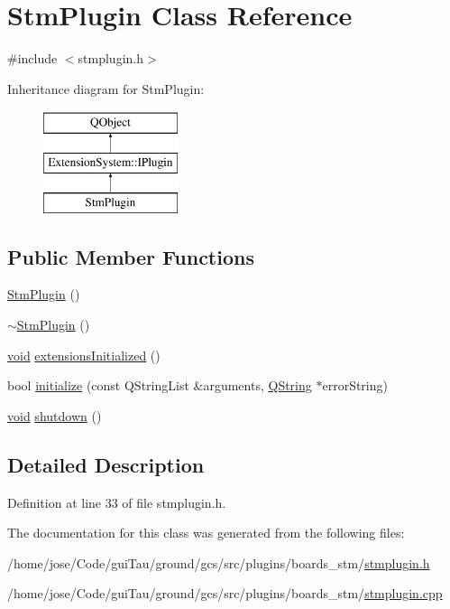 \hypertarget{class_stm_plugin}{\section{Stm\-Plugin Class Reference}
\label{class_stm_plugin}
}


{\ttfamily \#include $<$stmplugin.\-h$>$}

Inheritance diagram for Stm\-Plugin\-:\begin{figure}[H]
\begin{center}
\leavevmode
\includegraphics[height=3.000000cm]{class_stm_plugin}
\end{center}
\end{figure}
\subsection*{Public Member Functions}
\begin{DoxyCompactItemize}
\item 
\hyperlink{group___boards___stm_gab32837a38747d81c460fd1ba4bc438f8}{Stm\-Plugin} ()
\item 
\hyperlink{group___boards___stm_gaa4103ec74dcbf5261ad6ae6dc37da0ea}{$\sim$\-Stm\-Plugin} ()
\item 
\hyperlink{group___u_a_v_objects_plugin_ga444cf2ff3f0ecbe028adce838d373f5c}{void} \hyperlink{group___boards___stm_ga5269accdd6abc59b3b45cdf2f944d205}{extensions\-Initialized} ()
\item 
bool \hyperlink{group___boards___stm_ga9cf15e32e77519654896a82f0b301710}{initialize} (const Q\-String\-List \&arguments, \hyperlink{group___u_a_v_objects_plugin_gab9d252f49c333c94a72f97ce3105a32d}{Q\-String} $\ast$error\-String)
\item 
\hyperlink{group___u_a_v_objects_plugin_ga444cf2ff3f0ecbe028adce838d373f5c}{void} \hyperlink{group___boards___stm_ga0f818aaaedbf072833aef3d3ac944593}{shutdown} ()
\end{DoxyCompactItemize}


\subsection{Detailed Description}


Definition at line 33 of file stmplugin.\-h.



The documentation for this class was generated from the following files\-:\begin{DoxyCompactItemize}
\item 
/home/jose/\-Code/gui\-Tau/ground/gcs/src/plugins/boards\-\_\-stm/\hyperlink{stmplugin_8h}{stmplugin.\-h}\item 
/home/jose/\-Code/gui\-Tau/ground/gcs/src/plugins/boards\-\_\-stm/\hyperlink{stmplugin_8cpp}{stmplugin.\-cpp}\end{DoxyCompactItemize}

